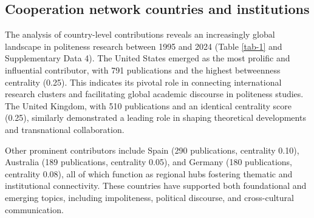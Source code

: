 \documentclass[english]{textolivre}
\begin{document}
\subsection{Cooperation network countries and institutions}
The analysis of country-level contributions reveals an increasingly global landscape in politeness research between 1995 and 2024 (Table \ref{tab-1} and Supplementary Data 4). The United States emerged as the most prolific and influential contributor, with 791 publications and the highest betweenness centrality (0.25). This indicates its pivotal role in connecting international research clusters and facilitating global academic discourse in politeness studies. The United Kingdom, with 510 publications and an identical centrality score (0.25), similarly demonstrated a leading role in shaping theoretical developments and transnational collaboration.

Other prominent contributors include Spain (290 publications, centrality 0.10), Australia (189 publications, centrality 0.05), and Germany (180 publications, centrality 0.08), all of which function as regional hubs fostering thematic and institutional connectivity. These countries have supported both foundational and emerging topics, including impoliteness, political discourse, and cross-cultural communication.
\end{document}
